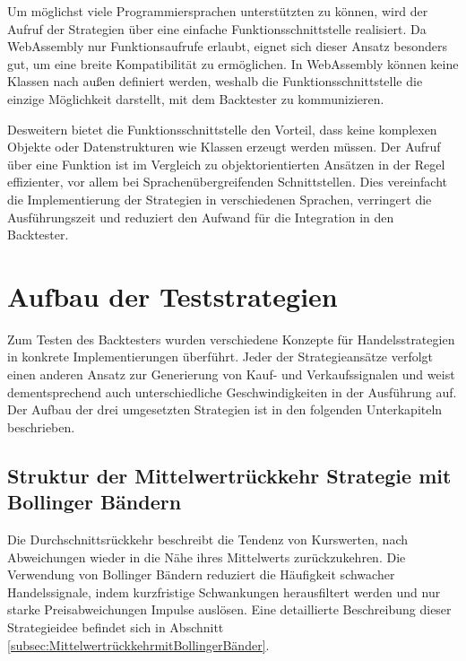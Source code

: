 Um möglichst viele Programmiersprachen unterstützten zu können, wird der Aufruf der Strategien über eine einfache Funktionsschnittstelle realisiert.
Da WebAssembly nur Funktionsaufrufe erlaubt, eignet sich dieser Ansatz besonders gut, um eine breite Kompatibilität zu ermöglichen.
In WebAssembly können keine Klassen nach außen definiert werden, weshalb die Funktionsschnittstelle die einzige Möglichkeit darstellt, mit dem Backtester zu kommunizieren.
\cite{webassemblyorg} \cite{WebUpSpeed}

Desweitern bietet die Funktionsschnittstelle den Vorteil, dass keine komplexen Objekte oder Datenstrukturen wie Klassen erzeugt werden müssen.
Der Aufruf über eine Funktion ist im Vergleich zu objektorientierten Ansätzen in der Regel effizienter, vor allem bei Sprachenübergreifenden Schnittstellen.
Dies vereinfacht die Implementierung der Strategien in verschiedenen Sprachen, verringert die Ausführungszeit und reduziert den Aufwand für die Integration in den Backtester.
\cite{Hughes1990WhyFP} \cite{WebUpSpeed}

\section{Aufbau der Teststrategien}
\label{sec:AufbauderTeststrategien}

Zum Testen des Backtesters wurden verschiedene Konzepte für Handelsstrategien in konkrete Implementierungen überführt.
Jeder der Strategieansätze verfolgt einen anderen Ansatz zur Generierung von Kauf- und Verkaufssignalen und weist dementsprechend auch unterschiedliche Geschwindigkeiten in der Ausführung auf.
Der Aufbau der drei umgesetzten Strategien ist in den folgenden Unterkapiteln beschrieben.

\subsection{Struktur der Mittelwertrückkehr Strategie mit Bollinger Bändern}
\label{subsec:StrukturderMittelwertrückkehrStrategiemitBollingerBändern}

Die Durchschnittsrückkehr beschreibt die Tendenz von Kurswerten, nach Abweichungen wieder in die Nähe ihres Mittelwerts zurückzukehren.
Die Verwendung von Bollinger Bändern reduziert die Häufigkeit schwacher Handelssignale, indem kurzfristige Schwankungen herausfiltert werden und nur starke Preisabweichungen Impulse auslösen.
Eine detaillierte Beschreibung dieser Strategieidee befindet sich in Abschnitt \ref{subsec:MittelwertrückkehrmitBollingerBänder}.

